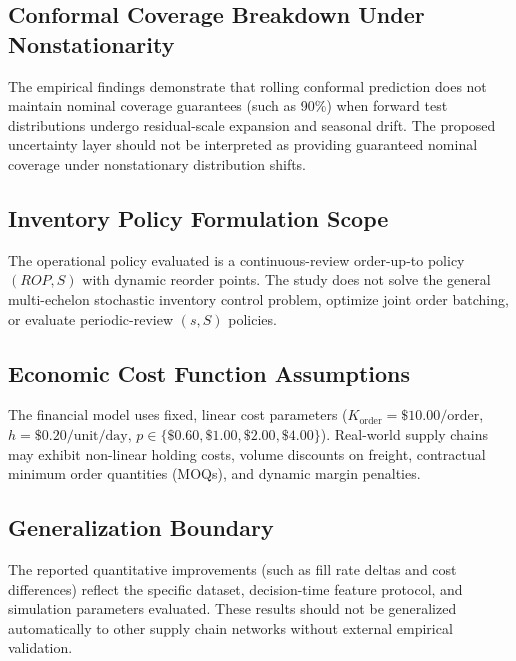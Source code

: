 \subsection{Conformal Coverage Breakdown Under Nonstationarity}
The empirical findings demonstrate that rolling conformal prediction does not maintain nominal coverage guarantees (such as 90\%) when forward test distributions undergo residual-scale expansion and seasonal drift. The proposed uncertainty layer should not be interpreted as providing guaranteed nominal coverage under nonstationary distribution shifts.

\subsection{Inventory Policy Formulation Scope}
The operational policy evaluated is a continuous-review order-up-to policy $(ROP, S)$ with dynamic reorder points. The study does not solve the general multi-echelon stochastic inventory control problem, optimize joint order batching, or evaluate periodic-review $(s, S)$ policies.

\subsection{Economic Cost Function Assumptions}
The financial model uses fixed, linear cost parameters ($K_{\text{order}}=\$10.00/\text{order}$, $h=\$0.20/\text{unit/day}$, $p \in \{\$0.60, \$1.00, \$2.00, \$4.00\}$). Real-world supply chains may exhibit non-linear holding costs, volume discounts on freight, contractual minimum order quantities (MOQs), and dynamic margin penalties.

\subsection{Generalization Boundary}
The reported quantitative improvements (such as fill rate deltas and cost differences) reflect the specific dataset, decision-time feature protocol, and simulation parameters evaluated. These results should not be generalized automatically to other supply chain networks without external empirical validation.
